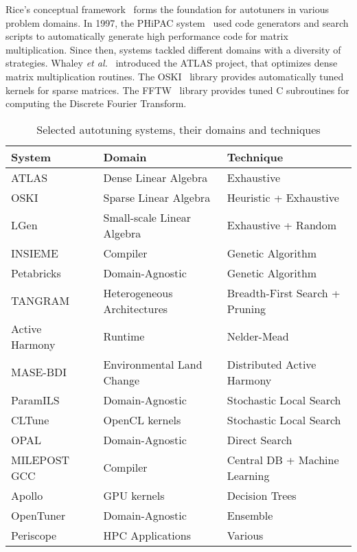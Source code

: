 Rice's conceptual framework~\cite{rice1976algorithm} forms the foundation for
autotuners in various problem domains.  In 1997, the PHiPAC
system~\cite{bilmes1997optimizing} used code generators and search scripts to
automatically generate high performance code for matrix multiplication. Since
then, systems tackled different domains with a diversity of strategies. Whaley
\emph{et al.}~\cite{dongarra1998automatically} introduced the ATLAS project,
that optimizes dense matrix multiplication routines. The
OSKI~\cite{vuduc2005oski} library provides automatically tuned kernels for
sparse matrices. The FFTW~\cite{frigo1998fftw} library provides tuned C
subroutines for computing the Discrete Fourier Transform.

\begin{table}[htpb]
    \centering
    \begin{tabular}{@{}lll@{}}
        \toprule
        System & Domain & Technique \\ \midrule
        ATLAS~\cite{dongarra1998automatically} & Dense Linear Algebra & Exhaustive \\
        OSKI~\cite{vuduc2005oski} & Sparse Linear Algebra & Heuristic + Exhaustive \\
        LGen~\cite{spampinato2014basic} & Small-scale Linear Algebra & Exhaustive + Random \\
        INSIEME~\cite{jordan2012multi} & Compiler & Genetic Algorithm \\
        Petabricks~\cite{ansel2009petabricks} & Domain-Agnostic & Genetic Algorithm\\
        TANGRAM~\cite{chang2016efficient} & Heterogeneous Architectures & Breadth-First Search + Pruning \\
        Active Harmony~\cite{tapus2002active} & Runtime & Nelder-Mead \\
        MASE-BDI~\cite{coelho2016mase} & Environmental Land Change & Distributed Active Harmony~\cite{tapus2002active} \\
        ParamILS~\cite{hutter2009paramils} & Domain-Agnostic & Stochastic Local Search \\
        CLTune~\cite{nugteren2015cltune} & OpenCL kernels & Stochastic Local Search\\
        OPAL~\cite{audet2014optimization} & Domain-Agnostic & Direct Search \\
        MILEPOST GCC~\cite{fursin2011milepost} & Compiler & Central DB + Machine Learning \\
        Apollo~\cite{beckingsale2017apollo} & GPU kernels & Decision Trees \\
        OpenTuner~\cite{ansel2014opentuner} & Domain-Agnostic & Ensemble \\
        Periscope~\cite{gerndt2017multi} & HPC Applications & Various \\
        \bottomrule
    \end{tabular}
    \caption{Selected autotuning systems, their domains and techniques}
    \label{tab:systems}
\end{table}

